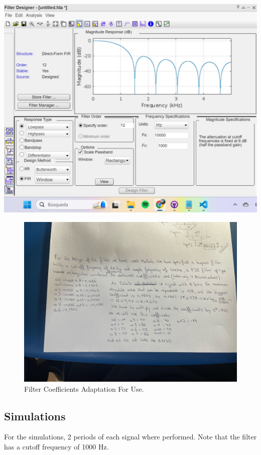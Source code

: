 \documentclass[a4paper, 12pt]{article}
\begin{document}
\begin{center}
\includegraphics[width=.9\linewidth]{./img/filter_coefficient_matlab.jpg}
\end{center}

\begin{figure}[htbp]
\centering
\includegraphics[width=.9\linewidth]{./img/filter_coefficient_calculations.jpg}
\caption{Filter Coefficients Adaptation For Use.}
\end{figure}
\subsection{Simulations}
\label{sec:orgdb684a3}

For the simulations, 2 periods of each signal where performed. Note that the filter has a cutoff frequency of 1000 Hz.
\end{document}
